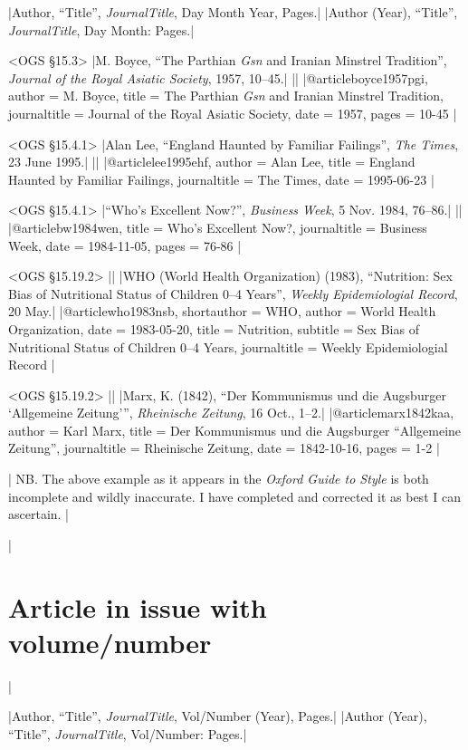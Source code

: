 \documentclass[extrafontsizes,11pt,a4paper,oneside]{memoir}
\begin{document}
\specs
|Author, \enquote{Title}, \emph{JournalTitle}, Day Month Year, Pages.|%
|Author (Year), \enquote{Title}, \emph{JournalTitle}, Day Month: Pages.|

\bibexample<OGS \S15.3>
|M. Boyce, \enquote{The Parthian \emph{Gsn} and Iranian Minstrel Tradition}, \emph{Journal of the Royal Asiatic Society}, 1957, 10--45.|%
||%
|@article{boyce1957pgi,
  author = {M. Boyce},
  title = {The Parthian \emph{Gsn} and Iranian Minstrel Tradition},
  journaltitle = {Journal of the Royal Asiatic Society},
  date = {1957},
  pages = {10-45}
}|

\bibexample<OGS \S15.4.1>
|Alan Lee, \enquote{England Haunted by Familiar Failings}, \emph{The Times}, 23 June 1995.|%
||%
|@article{lee1995ehf,
  author = {Alan Lee},
  title = {England Haunted by Familiar Failings},
  journaltitle = {The Times},
  date = {1995-06-23}
}|

\bibexample<OGS \S15.4.1>
|\enquote{Who's Excellent Now?}, \emph{Business Week}, 5 Nov. 1984, 76--86.|%
||%
|@article{bw1984wen,
  title = {Who's Excellent Now?},
  journaltitle = {Business Week},
  date = {1984-11-05},
  pages = {76-86}
}|

\bibexample<OGS \S15.19.2>
||%
|WHO (World Health Organization) (1983), \enquote{Nutrition: Sex Bias of Nutritional Status of Children 0–4 Years}, \emph{Weekly Epidemiologial Record}, 20 May.|%
|@article{who1983nsb,
  shortauthor = {WHO},
  author = {{World Health Organization}},
  date = {1983-05-20},
  title = {Nutrition},
  subtitle = {Sex Bias of Nutritional Status of Children 0–4 Years},
  journaltitle = {Weekly Epidemiologial Record}
}|

\bibexample<OGS \S15.19.2>
||%
|Marx, K. (1842), \enquote{Der Kommunismus und die Augsburger \enquote{Allgemeine Zeitung}}, \emph{Rheinische Zeitung}, 16 Oct., 1–2.|%
|@article{marx1842kaa,
  author = {Karl Marx},
  title = {Der Kommunismus und die Augsburger \enquote{Allgemeine Zeitung}},
  journaltitle = {Rheinische Zeitung},
  date = {1842-10-16},
  pages = {1-2}
}|

\todoc[oxyear]|
NB. The above example as it appears in the \emph{Oxford Guide to Style} is both incomplete and wildly inaccurate.
I have completed and corrected it as best I can ascertain.
|

\todoc|
\section{Article in issue with volume/number}
|

\specs
|Author, \enquote{Title}, \emph{JournalTitle}, Vol/Number (Year), Pages.|%
|Author (Year), \enquote{Title}, \emph{JournalTitle}, Vol/Number: Pages.|
\end{document}
